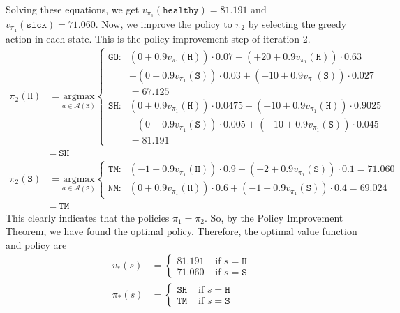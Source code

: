 \documentclass[11pt]{article}
\begin{document}
    Solving these equations, we get $v_{\pi_{1}}(\texttt{healthy}) = 81.191$ and $v_{\pi_{1}}(\texttt{sick}) = 71.060$. Now, we improve
    the policy to $\pi_{2}$ by selecting the greedy action in each state. This is the policy improvement step of iteration 2.
    \begin{align*}
        \pi_{2}(\texttt{H}) &= \underset{a \in \mathcal{A}(\texttt{H})}{\mathrm{argmax}} \begin{cases}
            \texttt{GO} : & (0 + 0.9 v_{\pi_{1}}(\texttt{H})) \cdot 0.07 + (+20 + 0.9 v_{\pi_{1}}(\texttt{H})) \cdot 0.63 \\
            &+ (0 + 0.9 v_{\pi_{1}}(\texttt{S})) \cdot 0.03 + (-10 + 0.9 v_{\pi_{1}}(\texttt{S})) \cdot 0.027 \\
            &= 67.125 \\
            \texttt{SH} : & (0 + 0.9 v_{\pi_{1}}(\texttt{H})) \cdot 0.0475 + (+10 + 0.9 v_{\pi_{1}}(\texttt{H})) \cdot 0.9025 \\
            &+ (0 + 0.9 v_{\pi_{1}}(\texttt{S})) \cdot 0.005 + (-10 + 0.9 v_{\pi_{1}}(\texttt{S})) \cdot 0.045 \\
            &= 81.191
        \end{cases} \\
        &= \ \texttt{SH} \\
        \pi_{2}(\texttt{S}) &= \underset{a \in \mathcal{A}(\texttt{S})}{\mathrm{argmax}} \begin{cases}
            \texttt{TM} : & (-1 + 0.9 v_{\pi_{1}}(\texttt{H})) \cdot 0.9 + (-2 + 0.9 v_{\pi_{1}}(\texttt{S})) \cdot 0.1 = 71.060 \\
            \texttt{NM} : & (0 + 0.9 v_{\pi_{1}}(\texttt{H})) \cdot 0.6 + (-1 + 0.9 v_{\pi_{1}}(\texttt{S})) \cdot 0.4 = 69.024
        \end{cases} \\
        &= \ \texttt{TM}
    \end{align*}
    This clearly indicates that the policies $\pi_{1} = \pi_{2}$. So, by the Policy Improvement Theorem, we have found the optimal policy.
    Therefore, the optimal value function and policy are
    \begin{align*}
        v_{*}(s) &= \begin{cases}
            81.191 & \text{ if } s = \texttt{H} \\
            71.060 & \text{ if } s = \texttt{S}
        \end{cases} \\
        \pi_{*}(s) &= \begin{cases}
            \texttt{SH} & \text{ if } s = \texttt{H} \\
            \texttt{TM} & \text{ if } s = \texttt{S}
        \end{cases}
    \end{align*}
\end{document}
